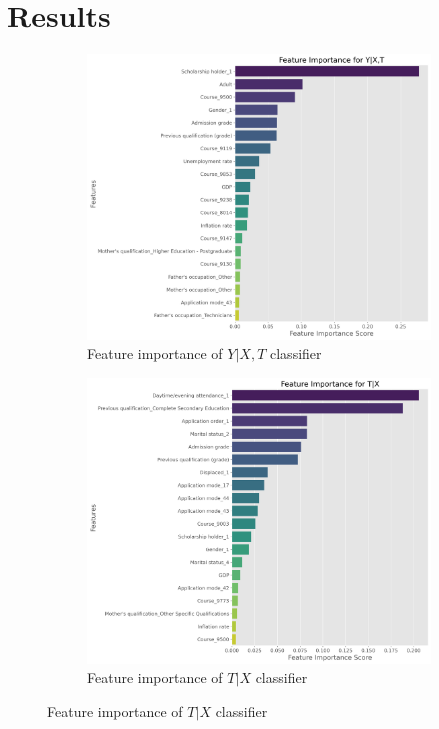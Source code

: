 \documentclass{article}
\newcommand{\gur}[1]{{\color{teal}{Gur: #1}}}
\begin{document}
\gur{Bootstrap}






\section{Results}

\begin{figure}
    \centering
    \caption{Important features of classifiers}
    \label{fig:feature_importance}
    \begin{subfigure}[b]{0.45\textwidth}
        \centering
        \includegraphics[width=\textwidth]{plots/feature_importance_y_given_xt.png}
        \caption{Feature importance of $Y | X, T$ classifier}
        \label{fig:feature_importance_y_given_xt}
    \end{subfigure}
    \hfill
    \begin{subfigure}[b]{0.45\textwidth}
        \centering
        \includegraphics[width=\textwidth]{plots/feature_importance_t_given_x.png}
        \caption{Feature importance of $T | X$ classifier}
        \label{fig:feature_importance_t_given_x}
    \end{subfigure}
\end{figure}
\end{document}
